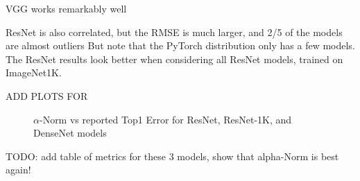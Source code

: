 VGG works remarkably well

ResNet is also correlated, but the RMSE is much larger, and 2/5 of the models are almost outliers
But note that the PyTorch distribution only has a few models.
The ResNet results look better when considering all ResNet models, trained on ImageNet1K.

ADD PLOTS FOR


\begin{figure}[t]
    \centering

    \qquad
    \qquad
    \caption{$\alpha$-Norm vs reported Top1 Error for  ResNet, ResNet-1K, and DenseNet models}
    \label{fig:cv2-accuracy}
\end{figure}


TODO:  add table of metrics for these 3 models, show that alpha-Norm is best again!

